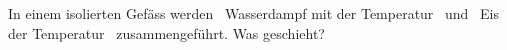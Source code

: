 In einem isolierten Gefäss werden \mDO\ Wasserdampf mit der Temperatur \TsO\ und \mEO\ Eis der Temperatur \TnO\ zusammengeführt. Was geschieht?
